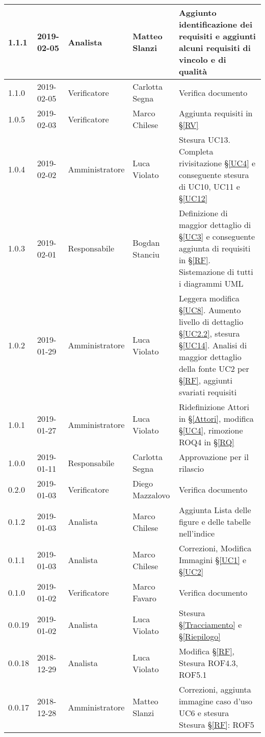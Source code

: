 \begin{center}
\begin{longtable}[C]{|m{}|m{}|m{}|m{}|p{}|}
\hline
\rowcolor{grigio}1.1.1 & 2019-02-05 & Analista & Matteo Slanzi & Aggiunto identificazione dei requisiti e  aggiunti alcuni requisiti di vincolo e di qualità \\
\hline
1.1.0 & 2019-02-05 & Verificatore & Carlotta Segna & Verifica documento \\
\hline
\rowcolor{grigio}1.0.5 & 2019-02-03 & Verificatore & Marco Chilese & Aggiunta requisiti in §\ref{RV}\\
\hline
1.0.4 & 2019-02-02 & Amministratore & Luca Violato & Stesura UC13. Completa rivisitazione §\ref{UC4} e conseguente stesura di UC10, UC11 e §\ref{UC12}\\
\hline
\rowcolor{grigio}1.0.3 & 2019-02-01 & Responsabile & Bogdan Stanciu &  Definizione di maggior dettaglio di §\ref{UC3} e conseguente aggiunta di requisiti in §\ref{RF}. Sistemazione di tutti i diagrammi UML \\
\hline
1.0.2 & 2019-01-29 & Amministratore & Luca Violato & Leggera modifica §\ref{UC8}. Aumento livello di dettaglio §\ref{UC2.2}, stesura §\ref{UC14}. Analisi di maggior dettaglio della fonte UC2 per §\ref{RF}, aggiunti svariati requisiti\\
\hline
\rowcolor{grigio}1.0.1 & 2019-01-27 & Amministratore & Luca Violato & Ridefinizione Attori in §\ref{Attori}, modifica §\ref{UC4}, rimozione ROQ4 in §\ref{RQ}\\
\hline
1.0.0 & 2019-01-11 & Responsabile & Carlotta Segna & Approvazione per il rilascio \\
\hline
\rowcolor{grigio}0.2.0 & 2019-01-03 & Verificatore & Diego Mazzalovo & Verifica documento\\
\hline
0.1.2 & 2019-01-03 & Analista & Marco Chilese & Aggiunta Lista delle figure e delle tabelle nell'indice\\
\hline
\rowcolor{grigio}0.1.1 & 2019-01-03 & Analista & Marco Chilese & Correzioni, Modifica Immagini §\ref{UC1} e §\ref{UC2}\\
\hline
 0.1.0 & 2019-01-02 & Verificatore & Marco Favaro & Verifica documento\\
\hline
\rowcolor{grigio}0.0.19 & 2019-01-02 & Analista & Luca Violato & Stesura §\ref{Tracciamento} e §\ref{Riepilogo}\\
\hline
0.0.18 & 2018-12-29 & Analista & Luca Violato & Modifica §\ref{RF}, Stesura ROF4.3, ROF5.1\\
\hline
\rowcolor{grigio}0.0.17 & 2018-12-28 & Amministratore & Matteo Slanzi & Correzioni, aggiunta immagine caso d'uso UC6 e stesura Stesura §\ref{RF}: ROF5\\

\end{longtable}
\end{center}
